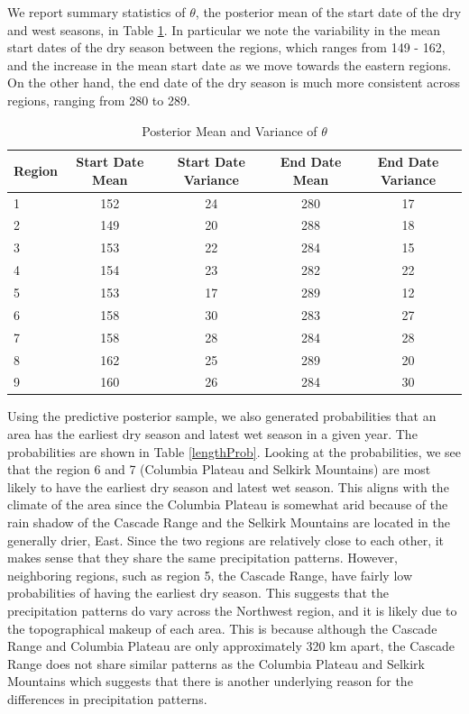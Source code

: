 \documentclass{article}
\begin{document}
We report summary statistics of $\theta$, the posterior mean of the start date of the dry and west seasons, in Table \ref{tab:meanparams}.  In particular we note the variability in the mean start dates of the dry season between the regions, which ranges from 149 - 162, and the increase in the mean start date as we move towards the eastern regions. On the other hand, the end date of the dry season is much more consistent across regions, ranging from 280 to 289. 

\begin{table}[h!]
\begin{tabular}{|l|c|c|c|c|}
\hline
Region & Start Date Mean & Start Date Variance & End Date Mean & End Date Variance\\
\hline
\hline
1&152&24&280&17\\
2&149&20&288&18\\
3&153&22&284&15\\
4&154&23&282&22\\
5&153&17&289&12\\
6&158&30&283&27\\
7&158&28&284&28\\
8&162&25&289&20\\
9&160&26&284&30\\
\hline
\end{tabular}
\caption{Posterior Mean and Variance of $\theta$}
\label{tab:meanparams}
\end{table}

Using the predictive posterior sample, we also generated probabilities that an area has the earliest dry season and latest wet season in a given year. The probabilities are shown in Table \ref{lengthProb}. Looking at the probabilities, we see that the region 6 and 7 (Columbia Plateau and Selkirk Mountains) are most likely to have the earliest dry season and latest wet season. This aligns with the climate of the area since the Columbia Plateau is somewhat arid because of the rain shadow of the Cascade Range and the Selkirk Mountains are located in the generally drier, East. Since the two regions are relatively close to each other, it makes sense that they share the same precipitation patterns. However, neighboring regions, such as region 5, the Cascade Range, have fairly low probabilities of having the earliest dry season. This suggests that the precipitation patterns do vary across the Northwest region, and it is likely due to the topographical makeup of each area. This is because although the Cascade Range and Columbia Plateau are only approximately 320 km apart, the Cascade Range does not share similar patterns as the Columbia Plateau and Selkirk Mountains which suggests that there is another underlying reason for the differences in precipitation patterns. 
\end{document}
